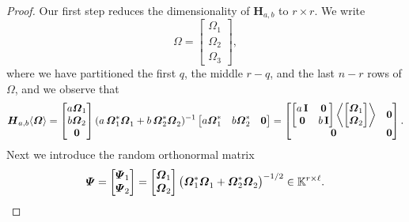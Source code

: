 \documentclass[11pt]{article}
\newcommand{\field}{\mathbb{K}}
\newcommand{\mat}[1]{\boldsymbol{#1}}
\newcommand{\Id}{\mathbf{I}}
\theoremstyle{definition}
\numberwithin{equation}{section}
\begin{document}
\begin{proof}
    Our first step reduces the dimensionality of $\mat{H}_{a,b}$ to $r \times r$.
    We write 
    \begin{equation*}
    \mat{\varOmega} = \begin{bmatrix} \mat{\varOmega}_1 \\ \mat{\varOmega}_2 \\ \mat{\varOmega}_3 \end{bmatrix},
    \end{equation*} 
    where we have partitioned the first $q$, the middle $r-q$, and the last $n-r$ rows of $\mat{\varOmega}$, and we observe that
    \begin{equation*}
        \mat{H}_{a,b}\langle \mat{\varOmega} \rangle 
        = \begin{bmatrix} a \mat{\varOmega}_1 \\ b \mat{\varOmega}_2 \\ \mat{0}
        \end{bmatrix}
        (a\,\mat{\varOmega}_1^* \mat{\varOmega}_1^{\vphantom{*}} + b\,\mat{\varOmega}_2^* \mat{\varOmega}_2^{\vphantom{*}})^{-1}
        \begin{bmatrix} a \mat{\varOmega}_1^* & b \mat{\varOmega}_2^* & \mat{0} \end{bmatrix}
        = \begin{bmatrix} \begin{bmatrix} a\,\Id & \mat{0} \\
        \mat{0} & b\,\Id
        \end{bmatrix} \left\langle \begin{bmatrix} \mat{\varOmega}_1 \\ \mat{\varOmega}_2 \end{bmatrix} \right\rangle & \mat{0} \\
        \mat{0} & \mat{0}
        \end{bmatrix}.
    \end{equation*}
    Next we introduce the random orthonormal matrix 
    \begin{equation*}
    \mat{\varPsi} = \begin{bmatrix} \mat{\varPsi}_1 \\ \mat{\varPsi}_2 \end{bmatrix}
    = \begin{bmatrix} \mat{\varOmega}_1 \\ \mat{\varOmega}_2 \end{bmatrix} \bigl(\mat{\varOmega}_1^* \mat{\varOmega}_1^{\vphantom{*}} + \mat{\varOmega}_2^* \mat{\varOmega}_2^{\vphantom{*}}\bigr)^{-1/2} \in \field^{r \times \ell}.

\end{equation*}
\end{proof}
\end{document}
